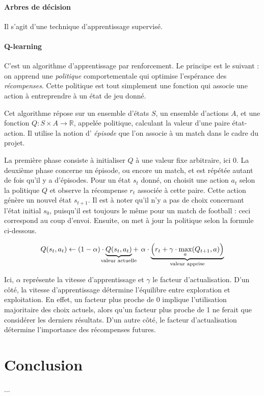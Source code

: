 \documentclass[12pt,a4paper]{article}
\begin{document}
\subsection*{Arbres de d\'ecision}
Il s'agit d'une technique d'apprentissage supervis\'e.

\subsection*{Q-learning}
C'est un algorithme d'apprentissage par renforcement. Le principe est le 
suivant : on apprend une {\itshape politique} comportementale qui optimise 
l'esp\'erance des {\itshape r\'ecompenses}. Cette politique est tout simplement 
une fonction qui associe une action \`a entreprendre \`a un \'etat de jeu 
donn\'e.

Cet algorithme r\'epose sur un ensemble d'\'etats $S$, un ensemble d'actions 
$A$, et une fonction $Q: S \times A \to \mathbb{R}$, appel\'ee politique, 
calculant la valeur d'une paire \'etat-action. Il utilise la notion d'{\itshape 
\'episode} que l'on associe \`a un match dans le cadre du projet.

La premi\`ere phase consiste \`a initialiser $Q$ \`a une valeur fixe 
arbitraire, ici 0. La deuxi\`eme phase concerne un \'episode, ou encore un 
match, et est r\'ep\'et\'ee autant de fois qu'il y a d'\'episodes. Pour un 
\'etat $s_t$ donn\'e, on choisit une action $a_t$ selon la politique $Q$ et 
observe la r\'ecompense $r_t$ associ\'ee \`a cette paire. Cette action 
g\'en\`ere un nouvel \'etat $s_{t+1}$. Il est \`a noter qu'il n'y a pas de 
choix concernant l'\'etat initial $s_0$, puisqu'il est toujours le m\^eme pour 
un match de football : ceci correspond au coup d'envoi. Ensuite, on met \`a 
jour la politique selon la formule ci-dessous.

\begin{equation*}
  Q(s_t,a_t) \gets (1-\alpha) \cdot 
  \underbrace{Q(s_t,a_t)}_{\mathclap{\text{valeur actuelle}}} + \ \alpha \cdot 
\underbrace{\Big(r_t + \gamma \cdot \max_a(Q_{t+1},a) 
  \Big)}_{\mathclap{\text{valeur   apprise}}}
\end{equation*}

Ici, $\alpha$ repr\'esente la vitesse d'apprentissage et $\gamma$ le facteur 
d'actualisation. D'un c\^ot\'e, la vitesse d'apprentissage d\'etermine 
l'\'equilibre entre exploration et exploitation. En effet, un facteur plus 
proche de 0 implique l'utilisation majoritaire des choix actuels, alors qu'un 
facteur plus proche de 1 ne ferait que consid\'erer les derniers r\'esultats.
D'un autre c\^ot\'e, le facteur d'actualisation d\'etermine l'importance des 
r\'ecompenses futures. 

\newpage

\part*{Conclusion}
...
\end{document}

